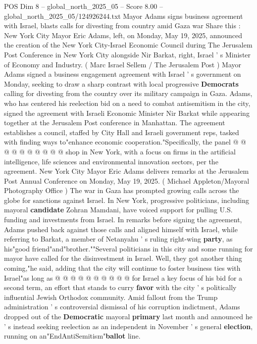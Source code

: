\begin{textsample}{POS Dim 8 – global\_north\_2025\_05 – Score 8.00 – global\_north\_2025\_05/124926244.txt}  \label{ex:f8_pos_400}
Mayor Adams signs business agreement with Israel, blasts calls for divesting from country amid Gaza war Share this : New York City Mayor Eric Adams, left, on Monday, May 19, 2025, announced the creation of the New York City-Israel Economic Council during The Jerusalem Post Conference in New York City alongside Nir Barkat, right, Israel ' s Minister of Economy and Industry. ( Marc Israel Sellem / The Jerusalem Post ) Mayor Adams signed a business engagement agreement with Israel ' s government on Monday, seeking to draw a sharp contrast with local progressive \textbf{Democrats} calling for divesting from the country over its military campaign in Gaza.
Adams, who has centered his reelection bid on a need to combat antisemitism in the city, signed the agreement with Israeli Economic Minister Nir Barkat while appearing together at the Jerusalem Post conference in Manhattan.
The agreement establishes a council, staffed by City Hall and Israeli government reps, tasked with finding ways to"enhance economic cooperation."Specifically, the panel @ @ @ @ @ @ @ @ @ @ shop in New York, with a focus on firms in the artificial intelligence, life sciences and environmental innovation sectors, per the agreement.
New York City Mayor Eric Adams delivers remarks at the Jerusalem Post Annual Conference on Monday, May 19, 2025. ( Michael Appleton/Mayoral Photography Office ) The war in Gaza has prompted growing calls across the globe for sanctions against Israel.
In New York, progressive politicians, including mayoral \textbf{candidate} Zohran Mamdani, have voiced support for pulling U.S. funding and investments from Israel.
In remarks before signing the agreement, Adams pushed back against those calls and aligned himself with Israel, while referring to Barkat, a member of Netanyahu ' s ruling right-wing \textbf{party}, as his"good friend"and"brother.""Several politicians in this city and some running for mayor have called for the disinvestment in Israel.
Well, they got another thing coming,"he said, adding that the city will continue to foster business ties with Israel"as long as @ @ @ @ @ @ @ @ @ @ for Israel a key focus of his bid for a second term, an effort that stands to curry \textbf{favor} with the city ' s politically influential Jewish Orthodox community.
Amid fallout from the Trump administration ' s controversial dismissal of his corruption indictment, Adams dropped out of the \textbf{Democratic} mayoral \textbf{primary} last month and announced he ' s instead seeking reelection as an independent in November ' s general \textbf{election}, running on an"EndAntiSemitism"\textbf{ballot} line.

\end{textsample}

